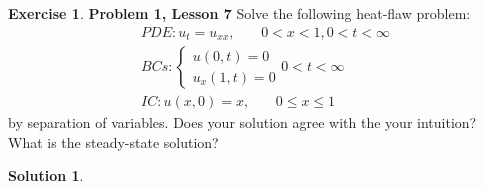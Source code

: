 \documentclass{book}
\theoremstyle{definition}
\newtheorem*{exer*}{Exercise}
\newtheorem*{sln*}{Solution}
\begin{document}
\begin{exer*}\textbf{Problem 1, Lesson 7}
	Solve the following heat-flaw problem:
	\begin{align*}
	&PDE: u_t = u_{xx},\,\,\,\,\,\,\,\,\,\,\, 0<x<1, 0<t<\infty\\
	&BCs:  
	\begin{cases}
	u(0,t) = 0\\
	u_x(1,t) = 0
	\end{cases} 0 < t < \infty\\
	&IC: u(x,0) = x,\,\,\,\,\,\,\,\,\,\,\, 0 \leq x\leq 1
	\end{align*}
	by separation of variables. Does your solution agree with the your intuition? What is the steady-state solution? 
	\begin{sln*}
		$\,$\\
		

\end{sln*}
\end{exer*}
\end{document}
